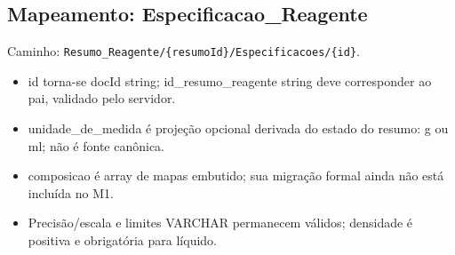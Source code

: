 \subsection*{Mapeamento: Especificacao\_Reagente}
Caminho: \texttt{Resumo\_Reagente/\{resumoId\}/Especificacoes/\{id\}}.
\begin{itemize}
\item id torna-se docId string; id\_resumo\_reagente string deve corresponder ao pai, validado pelo servidor.
\item unidade\_de\_medida é projeção opcional derivada do estado do resumo: g ou ml; não é fonte canônica.
\item composicao é array de mapas embutido; sua migração formal ainda não está incluída no M1.
\item Precisão/escala e limites VARCHAR permanecem válidos; densidade é positiva e obrigatória para líquido.
\end{itemize}
